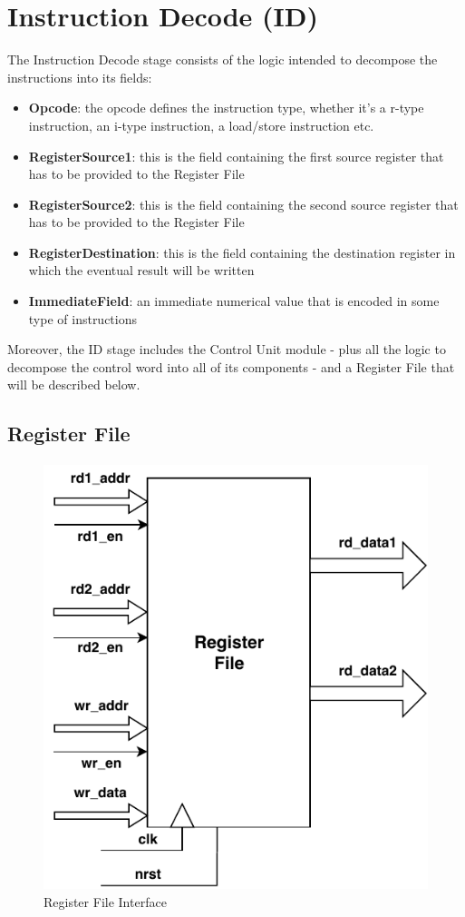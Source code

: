 \documentclass[10pt,  english, makeidx, a4paper, titlepage, oneside]{book}
\begin{document}
\section{Instruction Decode (ID)}
The Instruction Decode stage consists of the logic intended to decompose the instructions into its fields:
\begin{itemize}
    \item \textbf{Opcode}: the opcode defines the instruction type, whether it's a r-type instruction, an i-type instruction, a load/store instruction etc.
    \item \textbf{RegisterSource1}: this is the field containing the first source register that has to be provided to the Register File
    \item \textbf{RegisterSource2}: this is the field containing the second source register that has to be provided to the Register File
    \item \textbf{RegisterDestination}: this is the field containing the destination register in which the eventual result will be written
    \item \textbf{ImmediateField}: an immediate numerical value that is encoded in some type of instructions
\end{itemize}
Moreover, the ID stage includes the Control Unit module - plus all the logic to decompose the control word into all of its components - and a Register File that will be described below.

\subsection{Register File}

\begin{figure}
\paragraph{}
\vspace*{-\parskip}	\centering
	\includegraphics[width=.4\textwidth]{pics/RISCV_Core_RegFile.pdf}
	\caption{Register File Interface}
	\label{fig:regfile_interface}
\end{figure}
\end{document}
